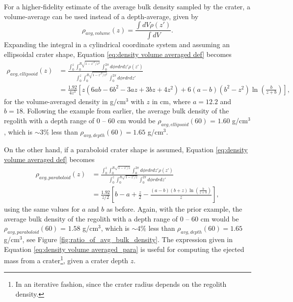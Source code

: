 \documentclass{article}
\begin{document}
For a higher-fidelity estimate of the average bulk density sampled by the crater, a volume-average can be used instead of a depth-average, given by
\begin{equation}\label{eq:density volume averaged def}
\rho_{avg, volume}(z) = \frac{\int dV \rho(z')}{\int dV}.
\end{equation}
Expanding the integral in a cylindrical coordinate system and assuming an ellipsoidal crater shape, Equation \eqref{eq:density volume averaged def} becomes
\begin{align}
\rho_{avg, ellipsoid}(z) &= \frac{\int_{0}^{z}\int_{0}^{R\sqrt{1-z'^2/z^2}}\int_{0}^{2\pi}d\phi rdr dz' \rho(z')}{\int_{0}^{z}\int_{0}^{R\sqrt{1-z'^2/z^2}}\int_{0}^{2\pi}d\phi rdr dz'}\\\label{eq:density volume averaged}
&= \frac{1.92}{4z^3}\left[z(6ab - 6b^2 - 3az + 3bz + 4z^2) + 6(a-b)(b^2-z^2)\ln\left(\frac{b}{z + b}\right)\right],
\end{align}
for the volume-averaged density in g/cm$^3$ with $z$ in cm, where $a = 12.2$ and $b = 18$. Following the example from earlier, the average bulk density of the regolith with a depth range of $0$ -- $60$ cm would be $\rho_{avg, ellipsoid}(60)$ = $1.60$ g/cm$^3$, which is $\sim 3\%$ less than $\rho_{avg, depth}(60) = 1.65$ g/cm$^3$.

On the other hand, if a paraboloid crater shape is assumed, Equation \eqref{eq:density volume averaged def} becomes
\begin{align}
\rho_{avg, paraboloid}(z) &= \frac{\int_{0}^{z}\int_{0}^{R\sqrt{1-z'/z}}\int_{0}^{2\pi}d\phi rdr dz' \rho(z')}{\int_{0}^{z}\int_{0}^{R\sqrt{1-z'/z}}\int_{0}^{2\pi}d\phi rdr dz'}\\\label{eq:density volume averaged_para}
&= \frac{1.92}{z/2}\left[b-a + \frac{z}{2} - \frac{(a-b)(b+z)\ln\left(\frac{b}{z+b}\right)}{z}\right],
\end{align}
using the same values for $a$ and $b$ as before. Again, with the prior example, the average bulk density of the regolith with a depth range of $0$ -- $60$ cm would be $\rho_{avg, paraboloid}(60)$ = $1.58$ g/cm$^3$, which is $\sim 4\%$ less than $\rho_{avg, depth}(60) = 1.65$ g/cm$^3$, see Figure \ref{fig:ratio_of_avg_bulk_density}. The expression given in Equation \eqref{eq:density volume averaged_para} is useful for computing the ejected mass from a crater\footnote{In an iterative fashion, since the crater radius depends on the regolith density.}, given a crater depth $z$.
\end{document}
